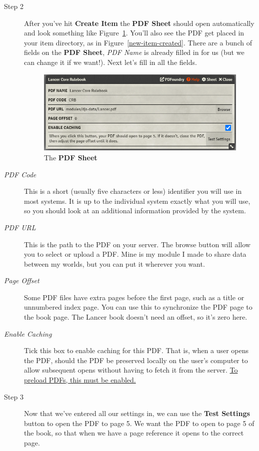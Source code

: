 \documentclass{article}
\begin{document}
\begin{description}
        \item [Step 2] After you've hit \textbf{Create Item} the \textbf{PDF Sheet} should open automatically and look something like Figure~\ref{new-item-sheet}. You'll also see the PDF get placed in your item directory, as in Figure~\ref{new-item-created}. There are a bunch of fields on the \textbf{PDF Sheet}, \textit{PDF Name} is already filled in for us (but we can change it if we want!). Next let's fill in all the fields.

        \begin{figure}[h]
            \centering
            \includegraphics[width=1\textwidth]{images/new-item-sheet.png}
            \caption{The \textbf{PDF Sheet}}
            \label{new-item-sheet}
        \end{figure}

        \item [\textit{PDF Code}] This is a short (usually five characters or less) identifier you will use in most systems. It is up to the individual system exactly what you will use, so you should look at an additional information provided by the system.

        \item [\textit{PDF URL}] This is the path to the PDF on your server. The browse button will allow you to select or upload a PDF. Mine is my module I made to share data between my worlds, but you can put it wherever you want.

        \item [\textit{Page Offset}] Some PDF files have extra pages before the first page, such as a title or unnumbered index page. You can use this to synchronize the PDF page to the book page. The Lancer book doesn't need an offset, so it's zero here.

        \item [\textit{Enable Caching}] Tick this box to enable caching for this PDF. That is, when a user opens the PDF, should the PDF be preserved locally on the user's computer to allow subsequent opens without having to fetch it from the server. \underline{To preload PDFs, this must be enabled.}

        \item [Step 3] Now that we've entered all our settings in, we can use the \textbf{Test Settings} button to open the PDF to page 5. We want the PDF to open to page 5 of the book, so that when we have a page reference it opens to the correct page.

    \end{description}
\end{document}

